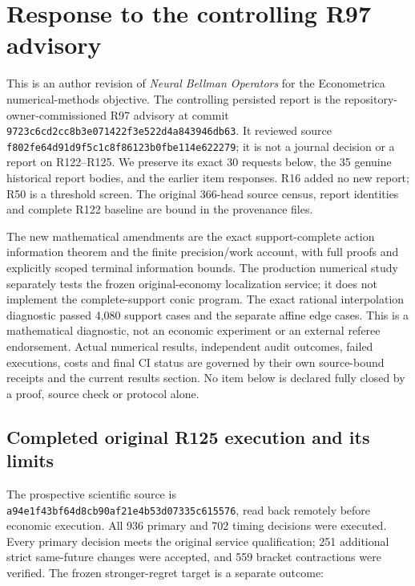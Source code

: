 \section{Response to the controlling R97 advisory}
\label{response:current125}

This is an author revision of \emph{Neural Bellman Operators} for the
Econometrica numerical-methods objective. The controlling persisted report is
the repository-owner-commissioned R97 advisory at commit
\nolinkurl{9723c6cd2cc8b3e071422f3e522d4a843946db63}. It reviewed source
\nolinkurl{f802fe64d91d9f5c1c8f86123b0fbe114e622279}; it is not a journal
decision or a report on R122--R125. We preserve its exact 30 requests below,
the 35 genuine historical report bodies, and the earlier item responses.
R16 added no new report; R50 is a threshold screen. The original 366-head
source census, report identities and complete R122 baseline are bound in
the provenance files.

The new mathematical amendments are the exact support-complete action
information theorem and the finite precision/work account, with full proofs
and explicitly scoped terminal information bounds. The production numerical
study separately tests the frozen original-economy localization service; it
does not implement the complete-support conic program. The exact rational
interpolation diagnostic passed 4,080 support cases and the separate affine
edge cases. This is a mathematical diagnostic, not an economic experiment
or an external referee endorsement. Actual numerical results, independent
audit outcomes, failed executions, costs and final CI status are governed
by their own source-bound receipts and the current results section. No
item below is declared fully closed by a proof, source check or protocol
alone.

\subsection{Completed original R125 execution and its limits}

The prospective scientific source is
\nolinkurl{a94e1f43bf64d8cb90af21e4b53d07335c615576}, read back remotely
before economic execution. All 936 primary and 702 timing decisions were
executed. Every primary decision meets the original service qualification;
251 additional strict same-future changes were accepted, and 559 bracket
contractions were verified. The frozen stronger-regret target is a separate
outcome:

